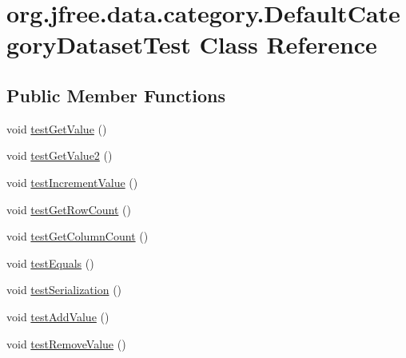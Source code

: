 \hypertarget{classorg_1_1jfree_1_1data_1_1category_1_1_default_category_dataset_test}{}\section{org.\+jfree.\+data.\+category.\+Default\+Category\+Dataset\+Test Class Reference}
\label{classorg_1_1jfree_1_1data_1_1category_1_1_default_category_dataset_test}
\subsection*{Public Member Functions}
\begin{DoxyCompactItemize}
\item 
void \mbox{\hyperlink{classorg_1_1jfree_1_1data_1_1category_1_1_default_category_dataset_test_a0e2ee66d4a17d35d5b53ea93bcd637ea}{test\+Get\+Value}} ()
\item 
void \mbox{\hyperlink{classorg_1_1jfree_1_1data_1_1category_1_1_default_category_dataset_test_a1605b34de2b9c1c5d40e0e3370c7ccd3}{test\+Get\+Value2}} ()
\item 
void \mbox{\hyperlink{classorg_1_1jfree_1_1data_1_1category_1_1_default_category_dataset_test_aad07e3dcacd56c7902fb744a66786ce0}{test\+Increment\+Value}} ()
\item 
void \mbox{\hyperlink{classorg_1_1jfree_1_1data_1_1category_1_1_default_category_dataset_test_a80cdd6f18b4380a95d9bc96c4ef2ddb5}{test\+Get\+Row\+Count}} ()
\item 
void \mbox{\hyperlink{classorg_1_1jfree_1_1data_1_1category_1_1_default_category_dataset_test_ae0cfcdece01c01ce1f2974e614d88d5b}{test\+Get\+Column\+Count}} ()
\item 
void \mbox{\hyperlink{classorg_1_1jfree_1_1data_1_1category_1_1_default_category_dataset_test_a50109ea30f3a4300ee952f88da944cbb}{test\+Equals}} ()
\item 
void \mbox{\hyperlink{classorg_1_1jfree_1_1data_1_1category_1_1_default_category_dataset_test_ae63b9157f9f1b880696df5671bfa7c3a}{test\+Serialization}} ()
\item 
void \mbox{\hyperlink{classorg_1_1jfree_1_1data_1_1category_1_1_default_category_dataset_test_ab7204dde8cd689b1b8958775a96a7ad5}{test\+Add\+Value}} ()
\item 
void \mbox{\hyperlink{classorg_1_1jfree_1_1data_1_1category_1_1_default_category_dataset_test_abfba56c1eb11d6a67b44235d9dc9a17e}{test\+Remove\+Value}} ()

\end{DoxyCompactItemize}
